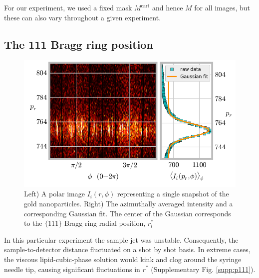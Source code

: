 \documentclass [12pt,fleqn]{article}
\begin{document}
For our experiment, we used a fixed mask $M^{\text{cart}}$ and hence $M$ for all images, but these can also vary throughout a given experiment.

%

\subsection{The 111 Bragg ring position}

\begin{figure}[H]
\includegraphics{supp_figs/bragg_ring_position.png}

\caption{Left) A polar image $I_i(r, \phi)$ representing a single snapshot of the gold nanoparticles. Right) The azimuthally averaged intensity and a corresponding Gaussian fit. The center of the Gaussian corresponds to the $\{111\}$ Bragg ring radial position, $r^*_i$}
\end{figure}
In this particular experiment the sample jet was unstable. Consequently, the sample-to-detector distance fluctuated on a shot by shot basis. In extreme cases, the viscous lipid-cubic-phase solution would kink and clog around the syringe needle tip, causing significant fluctuations in $r^*$ (Supplementary Fig. \ref{supp:p111}).
\end{document}
